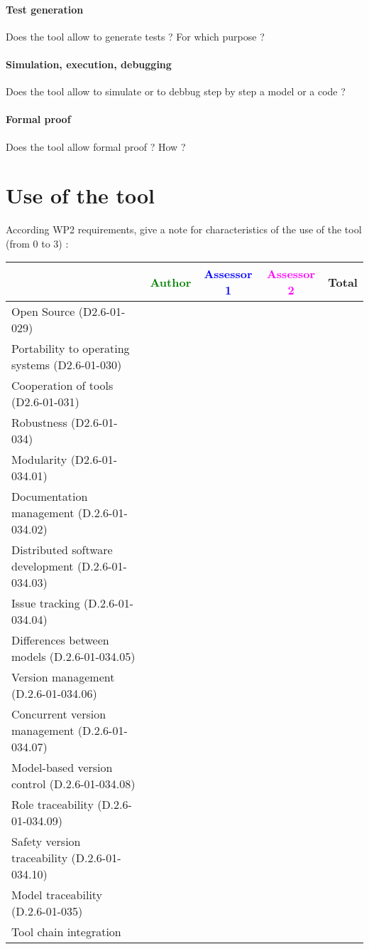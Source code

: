 \paragraph{Test generation}
Does the tool allow to generate tests ? For  which purpose ?

\paragraph{Simulation, execution, debugging}
Does the tool allow to simulate or to debbug step by step a model or a code ?

\paragraph{Formal proof}
Does the tool allow formal proof ?  How ?



\section{Use of the tool}


According WP2 requirements, give a note for characteristics of the use of the tool (from 0 to 3) :

\begin{tabular}{|l | c | c | c | c|}
\hline
& \textcolor{green}{Author} & \textcolor{blue}{Assessor 1} & \textcolor{magenta}{Assessor 2} & Total \\
\hline 
Open Source (D2.6-01-029) & & & &  \\
\hline 
Portability to operating systems (D2.6-01-030) & & & &  \\
\hline
Cooperation of tools (D2.6-01-031) & & & &  \\
\hline
Robustness (D2.6-01-034) & & & & \\
\hline
Modularity (D2.6-01-034.01) & & & & \\
\hline
Documentation management (D.2.6-01-034.02) & & & & \\
\hline
Distributed software development (D.2.6-01-034.03)  & & & & \\
\hline
Issue tracking (D.2.6-01-034.04) & & & & \\
\hline
Differences between models (D.2.6-01-034.05) & & & & \\
\hline
Version management (D.2.6-01-034.06) & & & & \\
\hline
Concurrent version management (D.2.6-01-034.07) & & & & \\
\hline
Model-based version control (D.2.6-01-034.08) & & & & \\
\hline
Role traceability (D.2.6-01-034.09) & & & & \\
\hline
Safety version traceability (D.2.6-01-034.10) & & & & \\
\hline
Model traceability (D.2.6-01-035) & & & & \\
\hline
Tool chain integration & & & & \\
\hline
\end{tabular}

